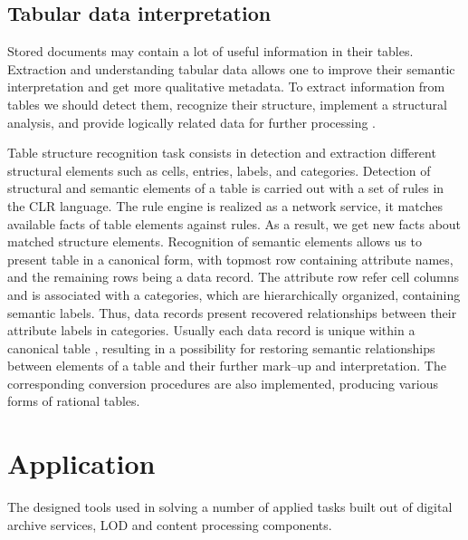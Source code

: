 \documentclass[conference,a4paper]{IEEEtran}
\begin{document}
\subsection{Tabular data interpretation}

Stored documents may contain a lot of useful information in their tables.  Extraction and understanding tabular data allows one to improve their semantic interpretation and get more qualitative metadata.  To extract information from tables we should detect them, recognize their structure, implement a structural analysis, and provide logically related data for further processing \cite{Shigarov_2017}.

Table structure recognition task consists in detection and extraction different structural elements such as cells, entries, labels, and categories.  Detection of structural and semantic elements of a table is carried out with a set of rules in the CLR language.  The rule engine is realized as a network service, it matches available facts of table elements against rules.  As a result, we get new facts about matched structure elements.  Recognition of semantic elements allows us to present table in a canonical form, with topmost row containing attribute names, and the remaining rows being a data record.  The attribute row refer cell columns and is associated with a categories, which are hierarchically organized, containing semantic labels.  Thus, data records present recovered relationships between their attribute labels in  categories.  Usually each data record is unique within a canonical table \cite{Shigarov_2016}, resulting in a possibility for restoring semantic relationships between elements of a table and their further mark--up and interpretation.  The corresponding conversion procedures are also implemented, producing various forms of rational tables.

\section{Application}

The designed tools used in solving a number of applied tasks built out of digital archive services, LOD and content processing components.
\end{document}
